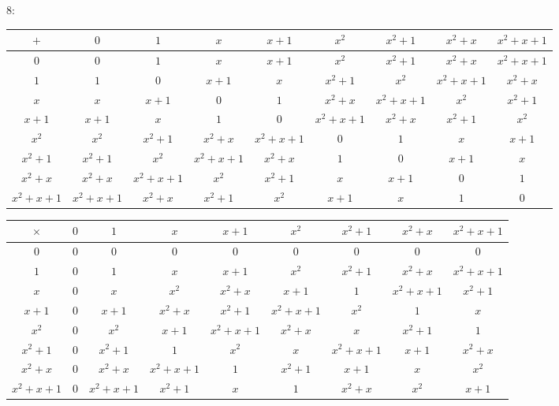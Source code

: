 		8:
		\begin{center}
			\begin{tabular}{|c|c|c|c|c|c|c|c|c|}
				\hline
				$+ $&$ 0 $&$ 1 $&$ x $&$ x+1 $&$ x^2 $&$ x^2+1 $&$ x^2+x $&$ x^2+x+1$\\
				\hline
				$0 $&$ 0 $&$ 1 $&$ x $&$ x+1 $&$ x^2 $&$ x^2+1 $&$ x^2+x $&$ x^2+x+1$\\
				\hline
				$1 $&$ 1 $&$ 0 $&$ x+1 $&$ x $&$ x^2+1 $&$ x^2 $&$ x^2+x+1 $&$ x^2+x$\\
				\hline
				$x $&$ x $&$ x+1 $&$ 0 $&$ 1 $&$ x^2+x $&$ x^2+x+1 $&$ x^2 $&$ x^2+1$\\
				\hline
				$x+1 $&$ x+1 $&$ x $&$ 1 $&$ 0 $&$ x^2+x+1 $&$ x^2+x $&$ x^2+1 $&$ x^2$\\
				\hline
				$x^2 $&$ x^2 $&$ x^2+1 $&$ x^2+x $&$ x^2+x+1 $&$ 0 $&$ 1 $&$ x $&$ x+1$\\
				\hline
				$x^2+1 $&$ x^2+1 $&$ x^2 $&$ x^2+x+1 $&$ x^2+x $&$ 1 $&$ 0 $&$ x+1$&$ x$\\
				\hline
				$x^2+x $&$ x^2+x $&$ x^2+x+1 $&$ x^2 $&$ x^2+1 $&$ x $&$ x+1 $&$ 0 $&$ 1$\\
				\hline
				$x^2+x+1 $&$ x^2+x+1 $&$ x^2+x $&$ x^2+1 $&$ x^2 $&$ x+1 $&$ x $&$ 1 $&$ 0$\\
				\hline
			\end{tabular}
		\end{center}
		\begin{center}
			\begin{tabular}{|c|c|c|c|c|c|c|c|c|}
				\hline
				$\times $&$ 0 $&$ 1 $&$ x $&$ x+1 $&$ x^2 $&$ x^2+1 $&$ x^2+x $&$ x^2+x+1$\\
				\hline
				$0 $&$ 0 $&$ 0 $&$ 0 $&$ 0 $&$ 0 $&$ 0 $&$ 0 $&$ 0$\\
				\hline
				$1 $&$ 0 $&$ 1 $&$ x $&$ x+1 $&$ x^2 $&$ x^2+1 $&$ x^2+x $&$ x^2+x+1$\\
				\hline
				$x $&$ 0 $&$ x $&$ x^2 $&$ x^2+x $&$ x+1 $&$ 1 $&$ x^2+x+1 $&$ x^2+1$\\
				\hline
				$x+1 $&$ 0 $&$ x+1 $&$ x^2+x $&$ x^2+1 $&$ x^2+x+1 $&$ x^2 $&$ 1 $&$ x$\\
				\hline
				$x^2 $&$ 0 $&$ x^2 $&$ x+1 $&$ x^2+x+1 $&$ x^2+x $&$ x $&$ x^2+1 $&$ 1$\\
				\hline
				$x^2+1 $&$ 0 $&$ x^2+1 $&$ 1 $&$ x^2 $&$ x $&$ x^2+x+1 $&$ x+1 $&$ x^2+x$\\
				\hline
				$x^2+x $&$ 0 $&$ x^2+x $&$ x^2+x+1 $&$ 1 $&$ x^2+1 $&$ x+1 $&$ x $&$ x^2$\\
				\hline
				$x^2+x+1 $&$ 0 $&$ x^2+x+1 $&$ x^2+1 $&$ x $&$ 1 $&$ x^2+x $&$ x^2 $&$ x+1$\\
				\hline
			\end{tabular}
		\end{center}	
